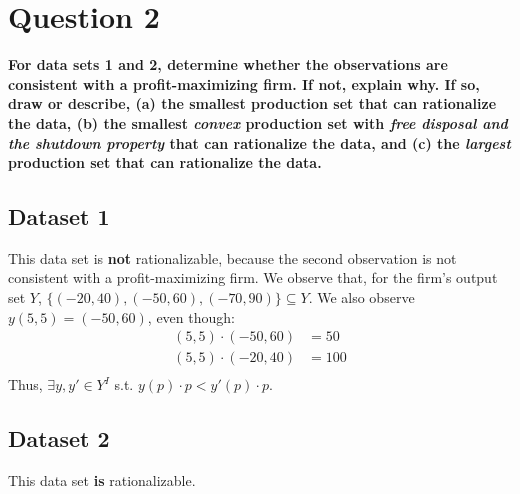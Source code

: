 \documentclass{article}
\begin{document}

\section*{Question 2}
\textbf{For data sets 1 and 2, determine whether the observations are consistent with a profit-maximizing firm. If not, explain why. If so, draw or describe, (a) the smallest production set that can rationalize the data, (b) the smallest \textit{convex} production set with \textit{free disposal and the shutdown property} that can rationalize the data, and (c) the \textit{largest} production set that can rationalize the data.}


\subsection*{Dataset 1}
This data set is \textbf{not} rationalizable, because the second observation is not consistent with a profit-maximizing firm. We observe that, for the firm's output set $Y$, $\{(-20,40),(-50,60),(-70,90)\}\subseteq Y$. We also observe $y(5,5)=(-50,60)$, even though:
\begin{align*}
	(5,5)\cdot(-50,60)&=50 \\
	(5,5)\cdot(-20,40)&=100 \\
\end{align*}
Thus, $\exists y,y'\in Y^I$ s.t. $y(p)\cdot p < y'(p)\cdot p$.


\subsection*{Dataset 2}
This data set \textbf{is} rationalizable.
\end{document}
